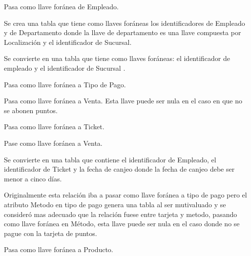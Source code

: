 \documentclass[10pt]{article}
\begin{document}
    	
    	\begin{description}[leftmargin=9em,style=nextline]
    		\item[Trabajar] Pasa como llave foránea de Empleado.\\
    		
    		\item[Supervisar] Se crea una tabla que tiene como llaves foráneas los identificadores de Empleado y de Departamento donde la llave de departamento es una llave compuesta por Localización y el identificador de Sucursal. \\
    		
    		\item[Dirigir] Se convierte en una tabla que tiene como llaves foráneas: el identificador de empleado y el identificador de Sucursal . \\
    		
    		\item[Pagar] Pasa como llave foránea a Tipo de Pago.\\
    		
    		\item[Abonar puntos] Pasa como llave foránea a Venta. Esta llave puede ser nula
    		en el caso en que no se abonen puntos.\\
    		
    		\item[Expedir] Pasa como llave foránea a Ticket.\\
    		
    		\item[Atender] Pase como llave foránea a Venta.\\
    		
    		\item[Canjear ticket] Se convierte en una tabla que contiene el identificador de Empleado, el identificador de Ticket y la fecha de canjeo donde la fecha de canjeo debe ser menor a cinco días.\\
    		
    		\item[Consumir saldo] Originalmente esta relación iba a pasar como llave foránea a tipo de pago pero el atributo Metodo en tipo de pago genera una tabla al ser mutivaluado y se consideró mas adecuado que la relación fuese entre tarjeta y metodo, pasando como llave foránea en Método, esta llave puede ser nula en el caso donde no se pague con la tarjeta de puntos.\\
    		
    		\item[Tener inventario] Pasa como llave foránea a Producto. \\
    		

\end{description}
\end{document}
